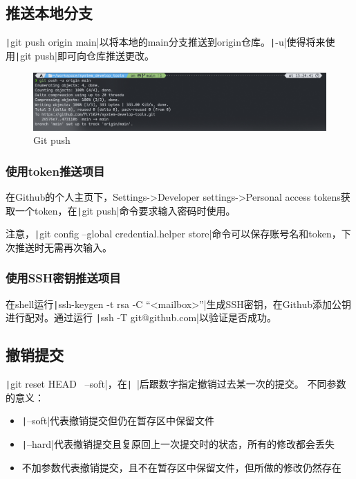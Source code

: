 \documentclass[fontset=ubuntu]{ctexart}
\begin{document}
\subsection{推送本地分支}
\texttt|git push origin main|以将本地的main分支推送到origin仓库。\texttt|-u|使得将来使用\texttt|git push|即可向仓库推送更改。
\begin{figure}[htb]
    \centering
    \includegraphics[width=0.75\linewidth]{git_push_1.png}
    \caption{Git push}
    \label{fig:git_push_1}
\end{figure}

\subsubsection{使用token推送项目}
在Github的个人主页下，Settings->Developer settings->Personal access tokens获取一个token，在\texttt|git push|命令要求输入密码时使用。

注意，\texttt|git config --global credential.helper store|命令可以保存账号名和token，下次推送时无需再次输入。

\subsubsection{使用SSH密钥推送项目}
在shell运行\texttt|ssh-keygen -t rsa -C “<mailbox>”|生成SSH密钥，在Github添加公钥进行配对。通过运行
\texttt|ssh -T git@github.com|以验证是否成功。

\subsection{撤销提交}
\texttt|git reset HEAD~ --soft|，在\texttt|~|后跟数字指定撤销过去某一次的提交。
不同参数的意义：
\begin{itemize}
    \item \texttt|--soft|代表撤销提交但仍在暂存区中保留文件
    \item \texttt|--hard|代表撤销提交且复原回上一次提交时的状态，所有的修改都会丢失
    \item 不加参数代表撤销提交，且不在暂存区中保留文件，但所做的修改仍然存在
\end{itemize}
\end{document}
